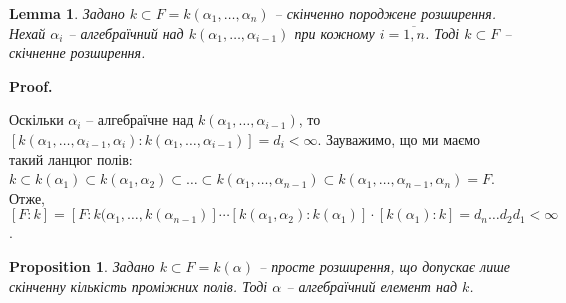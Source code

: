 \documentclass[a4paper, 10pt]{article}
\makeatletter
\theoremstyle{theoremdd}
\theoremstyle{theoremdd}
\theoremstyle{theoremdd}
\theoremstyle{theoremdd}
\theoremstyle{theoremdd}
\theoremstyle{theoremdd}
\theoremstyle{theoremdd}
\theoremstyle{theoremdd}
\theoremstyle{theoremdd}
\newtheorem{proposition}[theorem]{Proposition}
\theoremstyle{theoremdd}
\theoremstyle{theoremdd}
\theoremstyle{theoremdd}
\theoremstyle{theoremdd}
\newtheorem{lemma}[theorem]{Lemma}
\theoremstyle{theoremdd}
\theoremstyle{theoremdd}
\renewenvironment{proof}[1][Proof.\\]{\par
\pushQED{\hfill \qed}%
\normalfont \topsep6\p@\@plus6\p@\relax
\trivlist
\item\relax
{\bfseries
#1\@addpunct{.}}\hspace\labelsep\ignorespaces
}{%
\popQED\endtrivlist\@endpefalse
}
\makeatother
\begin{document}
\begin{lemma}
Задано $k \subset F = k(\alpha_1,\dots,\alpha_n)$ -- скінченно породжене розширення. Нехай $\alpha_i$ -- алгебраїчний над $k(\alpha_1,\dots,\alpha_{i-1})$ при кожному $i = \overline{1,n}$. Тоді $k \subset F$ -- скічненне розширення.
\end{lemma}

\begin{proof}
Оскільки $\alpha_i$ -- алгебраїчне над $k(\alpha_1,\dots,\alpha_{i-1})$, то $[k(\alpha_1,\dots,\alpha_{i-1},\alpha_i) : k(\alpha_1,\dots,\alpha_{i-1})] = d_i < \infty$. Зауважимо, що ми маємо такий ланцюг полів:\\
$k \subset k(\alpha_1) \subset k(\alpha_1,\alpha_2) \subset \dots \subset k(\alpha_1,\dots,\alpha_{n-1}) \subset k(\alpha_1,\dots,\alpha_{n-1}, \alpha_n) = F$.\\
Отже, $[F:k] = [F: k(\alpha_1,\dots,k(\alpha_{n-1})] \cdots [k(\alpha_1, \alpha_2):k(\alpha_1)] \cdot [k(\alpha_1):k] = d_n \dots d_2 d_1 < \infty$.
\end{proof}

\begin{proposition}
Задано $k \subset F = k(\alpha)$ -- просте розширення, що допускає лише скінченну кількість проміжних полів. Тоді $\alpha$ -- алгебраїчний елемент над $k$.
\end{proposition}
\end{document}
